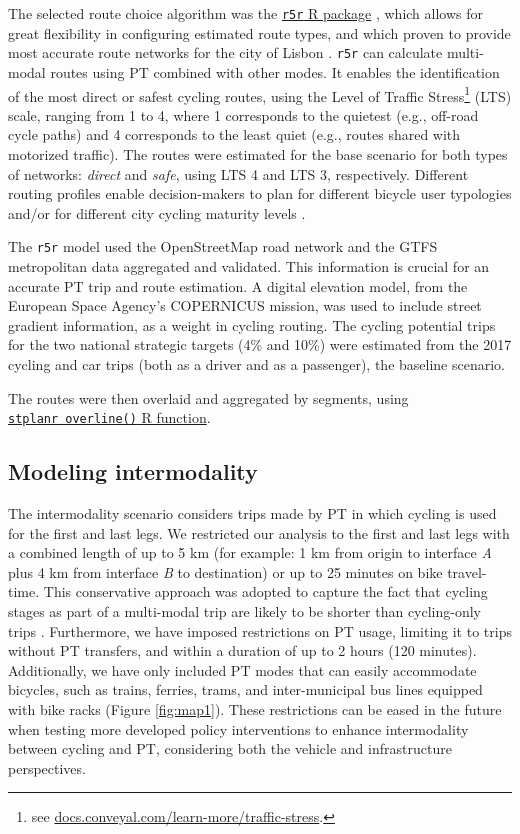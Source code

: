 \documentclass[review, doubleblind, 3p,
authoryear]{elsarticle} %
\begin{document}
The selected route choice algorithm was the
\href{https://ipeagit.github.io/r5r/}{\texttt{r5r} R package}
\citep{r5r}, which allows for great flexibility in configuring estimated
route types, and which proven to provide most accurate route networks
for the city of Lisbon \citep{Lovelace2022exploring}. \texttt{r5r} can
calculate multi-modal routes using PT combined with other modes. It
enables the identification of the most direct or safest cycling routes,
using the Level of Traffic Stress\footnote{see
  \href{https://docs.conveyal.com/learn-more/traffic-stress}{docs.conveyal.com/learn-more/traffic-stress}.}
(LTS) scale, ranging from 1 to 4, where 1 corresponds to the quietest
(e.g., off-road cycle paths) and 4 corresponds to the least quiet (e.g.,
routes shared with motorized traffic). The routes were estimated for the
base scenario for both types of networks: \emph{direct} and \emph{safe},
using LTS 4 and LTS 3, respectively. Different routing profiles enable
decision-makers to plan for different bicycle user typologies and/or for
different city cycling maturity levels \citep{felix2017}.

The \texttt{r5r} model used the OpenStreetMap road network and the GTFS
metropolitan data aggregated and validated. This information is crucial
for an accurate PT trip and route estimation. A digital elevation model,
from the European Space Agency's COPERNICUS mission, was used to include
street gradient information, as a weight in cycling routing. The cycling
potential trips for the two national strategic targets (4\% and 10\%)
were estimated from the 2017 cycling and car trips (both as a driver and
as a passenger), the baseline scenario.

The routes were then overlaid and aggregated by segments, using
\href{https://docs.ropensci.org/stplanr/reference/overline.html}{\texttt{stplanr\ overline()}
R function}.

\subsection{Modeling intermodality}\label{modeling-intermodality}

The intermodality scenario considers trips made by PT in which cycling
is used for the first and last legs. We restricted our analysis to the
first and last legs with a combined length of up to 5 km (for example: 1
km from origin to interface \emph{A} plus 4 km from interface \emph{B}
to destination) or up to 25 minutes on bike travel-time. This
conservative approach was adopted to capture the fact that cycling
stages as part of a multi-modal trip are likely to be shorter than
cycling-only trips \citep{vanmil_insights_2021}. Furthermore, we have
imposed restrictions on PT usage, limiting it to trips without PT
transfers, and within a duration of up to 2 hours (120 minutes).
Additionally, we have only included PT modes that can easily accommodate
bicycles, such as trains, ferries, trams, and inter-municipal bus lines
equipped with bike racks (Figure \ref{fig:map1}). These restrictions can
be eased in the future when testing more developed policy interventions
to enhance intermodality between cycling and PT, considering both the
vehicle and infrastructure perspectives.
\end{document}
